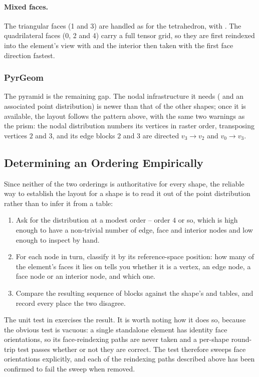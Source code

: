 \paragraph{Mixed faces.}  The triangular faces (1 and 3) are handled as for
the tetrahedron, with .  The quadrilateral faces (0,
2 and 4) carry a full tensor grid, so they are first reindexed into the
element's view with  and the interior then taken
with the first face direction fastest.

\subsubsection{PyrGeom}

The pyramid is the remaining gap.  The nodal infrastructure it needs
( and an associated point distribution) is newer than
that of the other shapes; once it is available, the layout follows the pattern
above, with the same two warnings as the prism: the nodal distribution numbers
its vertices in raster order, transposing vertices $2$ and $3$, and its edge
blocks $2$ and $3$ are directed $v_3 \! \to \! v_2$ and $v_0 \! \to \! v_3$.

\subsection{Determining an Ordering Empirically}
\label{sec:spatialdomains-orderings-method}

Since neither of the two orderings is authoritative for every shape, the
reliable way to establish the layout for a shape is to read it out of the
point distribution rather than to infer it from a table:

\begin{enumerate}
\item Ask  for the distribution at a modest order --
  order $4$ or so, which is high enough to have a non-trivial number of edge,
  face and interior nodes and low enough to inspect by hand.
\item For each node in turn, classify it by its reference-space position: how
  many of the element's faces it lies on tells you whether it is a vertex, an
  edge node, a face node or an interior node, and which one.
\item Compare the resulting sequence of blocks against the shape's
   and  tables, and record every place the two
  disagree.
\end{enumerate}

The unit test  in 
 exercises the result.  It is worth noting how it does
so, because the obvious test is vacuous: a single standalone element has
identity face orientations, so its face-reindexing paths are never taken and a
per-shape round-trip test passes whether or not they are correct.  The test
therefore sweeps face orientations explicitly, and each of the reindexing
paths described above has been confirmed to fail the sweep when removed.
